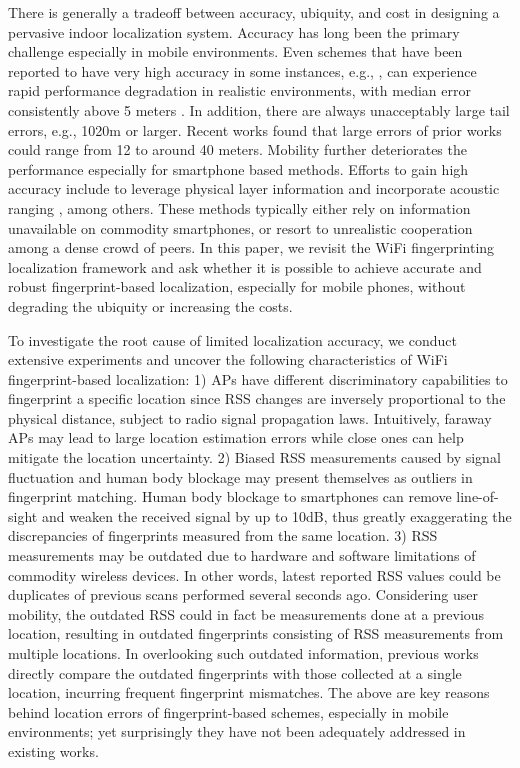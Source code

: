 \documentclass[10pt,conference,compsocconf,letterpaper]{./sty/IEEEtran}
\newcommand{\rev}[1]{{\color{blue}#1}} \newcommand{\com}[1]{\textbf{\color{red}(COMMENT: #1)}} \else
\newcommand{\rev}[1]{#1}
\newcommand{\com}[1]{}
\begin{document}
\rev{There is generally a tradeoff between accuracy, ubiquity, and cost in designing a pervasive indoor localization system.} Accuracy has long been the primary challenge especially in mobile environments. 
\rev{Even schemes that have been reported to have very high accuracy in some instances}, e.g., \cite{youssef_horus_2005, lim_zero_2010, rai_zee_2012}, can experience rapid performance degradation in realistic environments, with median error consistently above 5 meters \cite{turner2011empirical}. 
\rev{In addition,} there are always unacceptably large tail errors, e.g., 1020m or larger. Recent works \cite{turner2011empirical, liu_push_2012} found that 
large errors of prior works could range from 12 to around 40 meters. 
Mobility further deteriorates the performance especially for smartphone based methods. 
Efforts to gain high accuracy include to leverage physical layer information \cite{sen_you_2012} and  incorporate acoustic ranging \cite{liu2013guoguo, liu_push_2012}, among others.  These methods typically either rely on information unavailable on commodity smartphones, or resort to unrealistic cooperation among a dense crowd of peers. 
In this paper, we revisit the WiFi fingerprinting localization framework and ask whether it is possible to achieve accurate and robust fingerprint-based localization, especially for mobile phones, without degrading the ubiquity or increasing the costs. 

To investigate the root cause of limited localization accuracy, we conduct extensive experiments and uncover the following characteristics of WiFi fingerprint-based localization: 
1) APs have \rev{different discriminatory capabilities to fingerprint a specific location} since RSS changes are inversely proportional to the physical distance, subject to radio signal propagation laws. Intuitively, faraway APs may lead to large location estimation errors while close ones can help mitigate the location uncertainty. 
2) Biased RSS measurements caused by signal fluctuation and human body blockage may present themselves as outliers in fingerprint matching. Human body blockage to smartphones can remove line-of-sight and weaken the received signal by up to 10dB, thus greatly exaggerating the discrepancies of fingerprints measured from the same location. 
3) RSS measurements may be outdated due to hardware and software limitations of commodity wireless devices. In other words, latest reported RSS values could be duplicates of previous scans performed  several seconds ago. Considering user mobility, the outdated RSS could in fact be measurements done at a previous location, resulting in outdated fingerprints consisting of RSS measurements from multiple locations. In overlooking such outdated information, previous works directly compare the outdated fingerprints with those collected at a single location, incurring frequent fingerprint mismatches. 
The above are key reasons behind location errors of fingerprint-based schemes, especially in mobile environments; yet surprisingly they have not been adequately addressed in existing works.
\end{document}
